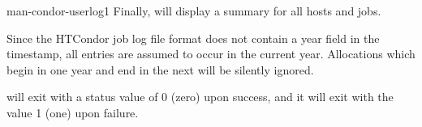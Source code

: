 \begin{ManPage}{}{man-condor-userlog}{1}
Finally,  will display a summary for all hosts and
jobs.

\begin{Options}
\end{Options}

\GenRem
Since the HTCondor job log file format does not contain a year field in
the timestamp, all entries are assumed to occur in the current year.
Allocations which begin in one year and end in the next will be
silently ignored.

\ExitStatus

 will exit with a status value of 0 (zero) upon success,
and it will exit with the value 1 (one) upon failure.

\end{ManPage}
